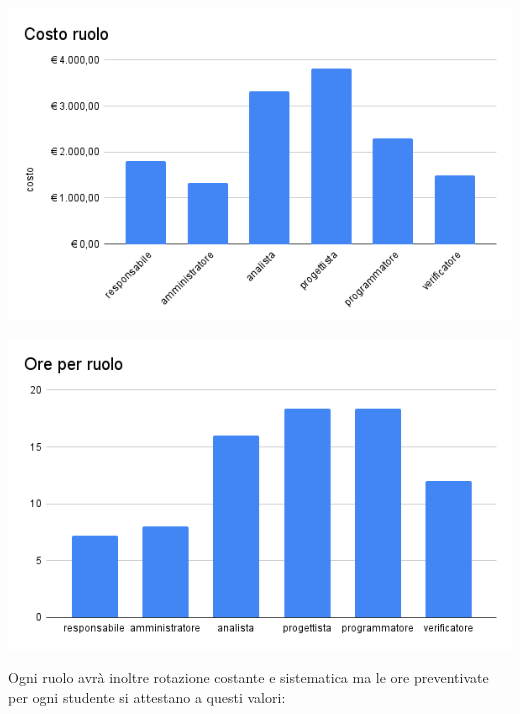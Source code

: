 \begin{minipage}[c][][c]{0.49\linewidth}
    \includegraphics[width=\textwidth]{immagini/Costo ruolo.png}
\end{minipage}
\begin{minipage}[c][][c]{0.49\linewidth}
    \includegraphics[width=\textwidth]{immagini/Ore per ruolo.png}
\end{minipage}

Ogni ruolo avrà inoltre rotazione costante e sistematica ma le ore preventivate per ogni studente si attestano a questi valori:

